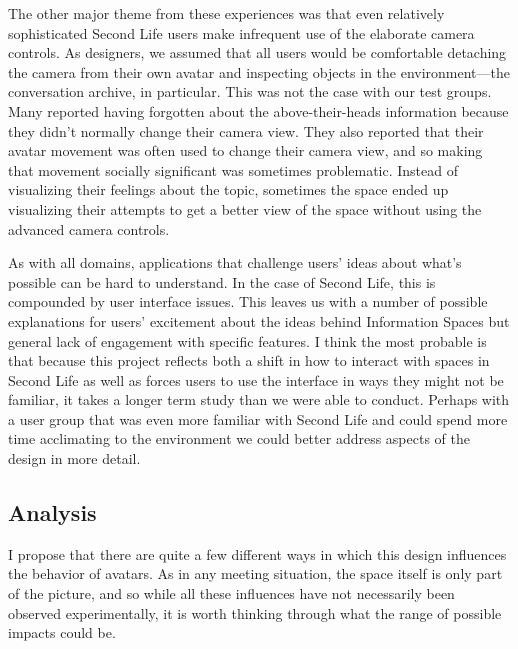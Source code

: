The other major theme from these experiences was that even relatively sophisticated Second Life users make infrequent use of the elaborate camera controls. As designers, we assumed that all users would be comfortable detaching the camera from their own avatar and inspecting objects in the environment—the conversation archive, in particular. This was not the case with our test groups. Many reported having forgotten about the above-their-heads information because they didn't normally change their camera view. They also reported that their avatar movement was often used to change their camera view, and so making that movement socially significant was sometimes problematic. Instead of visualizing their feelings about the topic, sometimes the space ended up visualizing their attempts to get a better view of the space without using the advanced camera controls.

As with all domains, applications that challenge users' ideas about what's possible can be hard to understand. In the case of Second Life, this is compounded by user interface issues. This leaves us with a number of possible explanations for users' excitement about the ideas behind Information Spaces but general lack of engagement with specific features. I think the most probable is that because this project reflects both a shift in how to interact with spaces in Second Life as well as forces users to use the interface in ways they might not be familiar, it takes a longer term study than we were able to conduct. Perhaps with a user group that was even more familiar with Second Life and could spend more time acclimating to the environment we could better address aspects of the design in more detail.

\subsection{Analysis}

I propose that there are quite a few different ways in which this design influences the behavior of avatars. As in any meeting situation, the space itself is only part of the picture, and so while all these influences have not necessarily been observed experimentally, it is worth thinking through what the range of possible impacts could be.


